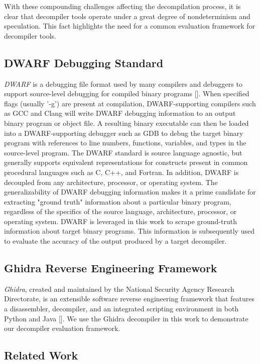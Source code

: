 \documentclass[conference]{IEEEtran}
\begin{document}
With these compounding challenges affecting the decompilation process, it is clear that decompiler tools operate under a great degree of nondeterminism and speculation. This fact highlights the need for a common evaluation framework for decompiler tools.

\subsection{DWARF Debugging Standard}

\emph{DWARF} is a debugging file format used by many compilers and debuggers to support source-level debugging for compiled binary programs []. When specified flags (usually '-g') are present at compilation, DWARF-supporting compilers such as GCC and Clang will write DWARF debugging information to an output binary program or object file. A resulting binary executable can then be loaded into a DWARF-supporting debugger such as GDB to debug the target binary program with references to line numbers, functions, variables, and types in the source-level program. The DWARF standard is source language agnostic, but generally supports equivalent representations for constructs present in common procedural languages such as C, C++, and Fortran. In addition, DWARF is decoupled from any architecture, processor, or operating system. The generalizability of DWARF debugging information makes it a prime candidate for extracting "ground truth" information about a particular binary program, regardless of the specifics of the source language, architecture, processor, or operating system. DWARF is leveraged in this work to scrape ground-truth information about target binary programs. This information is subsequently used to evaluate the accuracy of the output produced by a target decompiler.

\subsection{Ghidra Reverse Engineering Framework}

\emph{Ghidra}, created and maintained by the National Security Agency Research Directorate, is an extensible software reverse engineering framework that features a disassembler, decompiler, and an integrated scripting environment in both Python and Java []. We use the Ghidra decompiler in this work to demonstrate our decompiler evaluation framework.

\subsection{Related Work}
\end{document}
